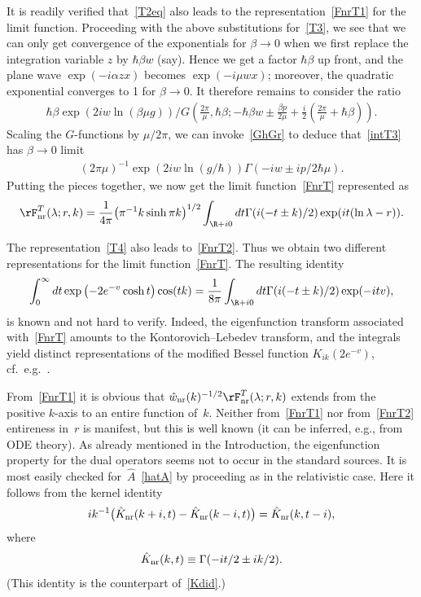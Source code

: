 \documentclass[pdftex]{sigma}
\numberwithin{equation}{section}
\begin{document}
It is readily verif\/ied that~\eqref{T2eq} also leads to the representation~\eqref{FnrT1} for the limit function. Proceeding with the above substitutions for~\eqref{T3}, we see that we can only get convergence of the exponentials for $\beta \to 0$ when we f\/irst replace the integration variable $z$ by $\hbar \beta w$ (say). Hence we get a factor $\hbar\beta$ up front, and the plane wave $\exp(-i\alpha zx)$ becomes $\exp(-i\mu wx)$; moreover, the quadratic exponential converges to 1 for $\beta\to 0$. It therefore remains to consider the ratio
\begin{gather}\label{intT3}
\hbar\beta\exp(2iw\ln (\beta\mu g))/G\left(\frac{2\pi}{\mu},\hbar\beta;-\hbar\beta w\pm \frac{\beta p}{2\mu}+\frac{i}{2}\left(\frac{2\pi}{\mu}+\hbar\beta\right)\right).
\end{gather}
Scaling the $G$-functions by $\mu/2\pi$, we can invoke~\eqref{GhGr} to deduce that~\eqref{intT3} has $\beta\to 0$ limit
\begin{gather}
(2\pi\mu)^{-1}\exp(2iw\ln (g/\hbar))\Gamma(-iw\pm ip/2\hbar\mu).
\end{gather}
Putting the pieces together, we now get the limit function~\eqref{FnrT} represented as
\begin{gather}\label{FnrT2}
\rF_{\rm nr}^T(\lambda;r,k)=\frac{1}{4\pi}\big(\pi^{-1}k\sinh \pi k\big)^{1/2}
\int_{\R+i0}dt\Gamma(i(-t\pm k)/2)\exp(it(\ln\lambda -r)).
\end{gather}

The representation~\eqref{T4} also leads to~\eqref{FnrT2}. Thus we obtain two dif\/ferent representations for the limit function~\eqref{FnrT}. The resulting identity
\begin{gather}
\int_0^{\infty} dt \exp\big({-}2 e^{-v}\cosh t\big)\cos(tk)=\frac{1}{8\pi}\int_{\R+i0}dt\Gamma(i(-t\pm k)/2)\exp(-itv),
\end{gather}
is known and not hard to verify. Indeed, the eigenfunction transform associated with~\eqref{FnrT} amounts to the Kontorovich--Lebedev transform, and the integrals yield distinct representations of the modif\/ied Bessel function $K_{ik}(2e^{-v})$, cf.\ e.g.~\cite[10.32.9, 10.32.13 and 10.43(v)]{dlmf}.

From~\eqref{FnrT1} it is obvious that $\hat{w}_{\rm nr}(k)^{-1/2}\rF_{\rm nr}^T(\lambda;r,k)$ extends from the positive $k$-axis to an entire function of~$k$. Neither from~\eqref{FnrT1} nor from~\eqref{FnrT2} entireness in~$r$ is manifest, but this is well known (it can be inferred, e.g., from ODE theory). As already mentioned in the Introduction, the eigenfunction property for the dual operators seems not to occur in the standard sources. It is most easily checked for~$\hat{A}$~\eqref{hatA} by proceeding as in the relativistic case. Here it follows from the kernel identity
\begin{gather}
ik^{-1}\big(\hat{K}_{\rm nr}(k+i,t)-\hat{K}_{\rm nr}(k-i,t)\big)
=\hat{K}_{\rm nr}(k,t-i),
\end{gather}
where
\begin{gather}
\hat{K}_{\rm nr}(k,t)\equiv \Gamma (-it/2\pm ik/2).
\end{gather}
(This identity is the counterpart of~\eqref{Kdid}.)
\end{document}

